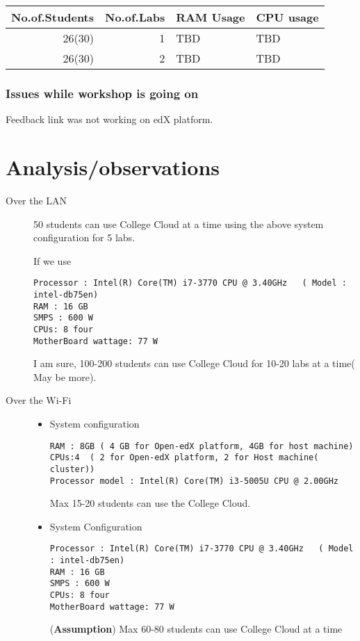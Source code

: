\documentclass[11pt]{article}
\begin{document}
\begin{center}
\begin{tabular}{rrll}
\hline
No.of.Students & No.of.Labs & RAM Usage & CPU usage\\
\hline
26(30) & 1 & TBD & TBD\\
\hline
26(30) & 2 & TBD & TBD\\
\hline
\end{tabular}
\end{center}

\subsubsection{Issues while workshop is going on}
\label{sec-3-3-1}
Feedback link was not working on edX platform.

\section{Analysis/observations}
\label{sec-4}
\begin{description}
\item[{Over the LAN}] 50 students can use College Cloud at a time using
the above system configuration for 5 labs. 

If we use
\begin{verbatim}
Processor : Intel(R) Core(TM) i7-3770 CPU @ 3.40GHz   ( Model : intel-db75en)
RAM : 16 GB
SMPS : 600 W
CPUs: 8 four
MotherBoard wattage: 77 W
\end{verbatim}

I am sure, 100-200 students can use College Cloud
for 10-20 labs at a time( May be more).
\item[{Over the Wi-Fi}] \begin{itemize}
\item System configuration 
\begin{verbatim}
RAM : 8GB ( 4 GB for Open-edX platform, 4GB for host machine)
CPUs:4  ( 2 for Open-edX platform, 2 for Host machine( cluster))
Processor model : Intel(R) Core(TM) i3-5005U CPU @ 2.00GHz
\end{verbatim}
Max 15-20 students can use the College Cloud.

\item System Configuration  
\begin{verbatim}
Processor : Intel(R) Core(TM) i7-3770 CPU @ 3.40GHz   ( Model : intel-db75en)
RAM : 16 GB
SMPS : 600 W
CPUs: 8 four
MotherBoard wattage: 77 W
\end{verbatim}
(\textbf{Assumption}) Max 60-80 students can use College Cloud at a
time
\end{itemize}
\end{description}
\end{document}
